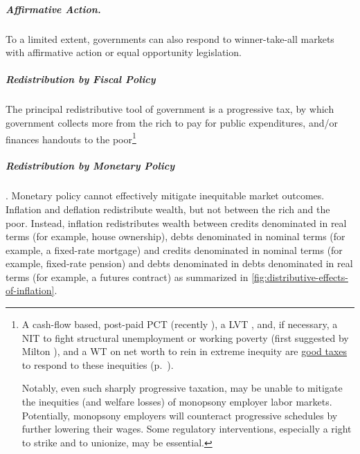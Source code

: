 \subparagraph{Affirmative Action.}  \label{sec:affirmative-action} To a limited extent, governments can also respond to winner-take-all markets with affirmative action or equal opportunity legislation.

\subparagraph{Redistribution by Fiscal Policy}  \label{sec:fiscal-redistribution} The principal redistributive tool of government is a progressive tax, by which government collects more from the rich to pay for public expenditures, and/or finances handouts to the poor\footnote{
	A cash-flow based, post-paid \gls{PCT} (recently \citealt{McCaffery2002,McCaffery2005}), a \gls{LVT} \citep{George1879}, and, if necessary, a \gls{NIT} to fight structural unemployment or working poverty (first suggested by Milton \citealt{Friedman1962}), and a \gls{WT} on net worth to rein in extreme inequity are \hyperref[chap:better-tax]{good taxes} to respond to these inequities (p.~\pageref{chap:better-tax}).
	
	Notably, even such sharply progressive taxation, may be unable to mitigate the inequities (and welfare losses) of monopsony employer labor markets. Potentially, monopsony employers will counteract progressive schedules by further lowering their wages. Some regulatory interventions, especially a right to strike and to unionize, may be essential.}




\subparagraph{Redistribution by Monetary Policy}  \label{sec:distributive-effects-of-inflation}.  Monetary policy cannot effectively mitigate inequitable market outcomes. Inflation and deflation redistribute wealth, but not between the rich and the poor. Instead, inflation redistributes wealth between credits denominated in real terms (for example, house ownership), debts denominated in nominal terms (for example, a fixed-rate mortgage) and credits denominated in nominal terms (for example, fixed-rate pension) and debts denominated in debts denominated in real terms (for example, a futures contract) as summarized in \autoref{fig:distributive-effects-of-inflation}. 

